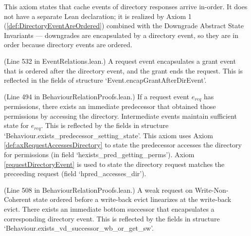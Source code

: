 \begin{definition}
  \label{def:axiom5_dir_responses_ordered}
  This axiom states that cache events of directory responses arrive in-order.
  It does not have a separate Lean declaration; it is
  realized by Axiom 1 (\ref{def:DirectoryEventAreOrdered}) combined with
  the Downgrade Abstract State Invariants --- downgrades are encapsulated by
  a directory event, so they are in order because directory events are ordered.
\end{definition}

\begin{definition}
  \label{def:encapGrantAfterDirEvent}
  \leanok
  (Line 532 in EventRelations.lean.)
  A request event encapsulates a grant event that is ordered after
  the directory event, and the grant ends the request.
  This is reflected in the fields of structure `Event.encapGrantAfterDirEvent'.
\end{definition}

\begin{definition}
  \label{def:exists_predecessor_setting_state}
  \leanok
  (Line 494 in BehaviourRelationProofs.lean.)
  If a request event $e_{req}$ has permissions, there exists an
  immediate predecessor that obtained those permissions by accessing
  the directory. Intermediate events maintain sufficient state for $e_{req}$.
  This is reflected by the fields in structure `Behaviour.exists\_predecessor\_setting\_state'.
  This axiom uses Axiom \ref{def:axRequestAccessesDirectory} to state the predecessor accesses the
  directory for permissions (in field `hexists\_pred\_getting\_perms'). Axiom \ref{requestDirectoryEvent} is used to state the directory request
  matches the preceeding request (field `hpred\_accesses\_dir').
\end{definition}

\begin{definition}
  \label{def:exists_vd_successor_wb_or_get_sw}
  \leanok
  (Line 508 in BehaviourRelationProofs.lean.)
  A weak request on Write-Non-Coherent state ordered before a write-back evict
  linearizes at the write-back evict.
  There exists an immediate bottom successor that encapsulates a corresponding
  directory event.
  This is reflected by the fields in structure `Behaviour.exists\_vd\_successor\_wb\_or\_get\_sw'.
\end{definition}

